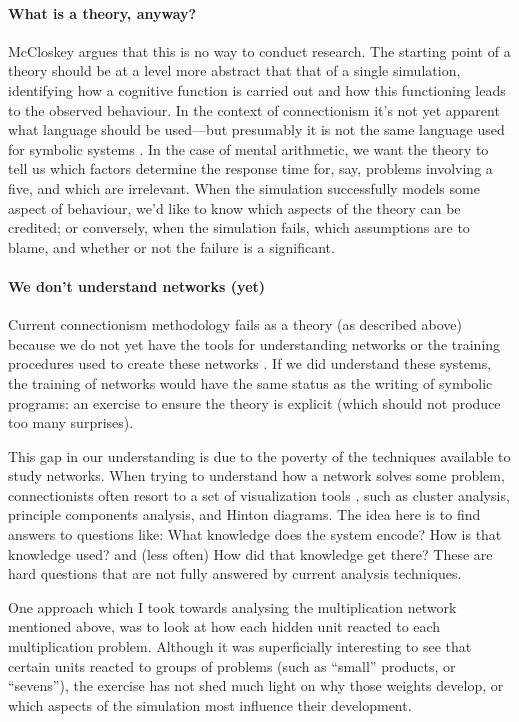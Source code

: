 \paragraph{What is a theory, anyway?}  McCloskey argues that this is no way
to conduct research.  The starting point of a theory should be at a level
more abstract that that of a single simulation, identifying how a cognitive
function is carried out and how this functioning leads to the observed
behaviour.  In the context of connectionism it's not yet apparent what
language should be used---but presumably it is not the same language used
for symbolic systems \cite{ptc}. In the case of mental arithmetic, we want
the theory to tell us which factors determine the response time for, say,
problems involving a five, and which are irrelevant.  When the simulation
successfully models some aspect of behaviour, we'd like to know which
aspects of the theory can be credited; or conversely, when the simulation
fails, which assumptions are to blame, and whether or not the failure is a
significant.


\paragraph{We don't understand networks (yet)} Current
connectionism methodology
fails as a theory (as described above) because we do
not yet have the tools for understanding networks or the training
procedures used to create these networks \cite{minsperc}.  If we did
understand these systems, the training of networks would have the same
status as the writing of symbolic programs:  an exercise to ensure the
theory is explicit (which should not produce too many surprises).

This gap in our understanding is due to the
poverty of the techniques available to study networks. When trying to
understand how a network solves some problem, connectionists often resort
to a set of visualization tools \cite{hanswhat}, such as cluster
analysis, principle components analysis, and Hinton diagrams.  The idea
here is to find answers to questions like: What knowledge does the system
encode? How is that knowledge used? and (less often) How did that knowledge
get there?  These are hard questions that are not fully answered by current
analysis techniques.

One approach which I took towards analysing the multiplication network
mentioned above, was to look at how each hidden unit reacted to each
multiplication problem. Although it was superficially interesting to see
that certain units reacted to groups of problems (such as ``small''
products, or ``sevens''), the exercise has not shed much light on why
those weights develop, or which aspects of the simulation most
influence their development.

